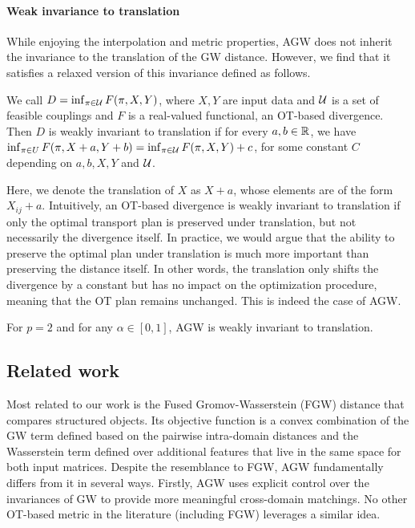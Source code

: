 \paragraph{Weak invariance to translation}
While enjoying the interpolation and metric properties, AGW does not inherit the invariance
to the translation of the GW distance. However, we find that it satisfies a relaxed version
of this invariance defined as follows.
\begin{definition}
    We call $D = \inf_{\pi \in \mathcal U} F(\pi, X, Y)$, where $X, Y$ are input data and $\mathcal U$
    is a set of feasible couplings and $F$ is a real-valued functional, an OT-based divergence.
    Then $D$ is weakly invariant to translation if for every $a, b \in \mathbb R$, we have
    $\inf_{\pi \in U} F(\pi, X + a, Y+b) = \inf_{\pi \in \mathcal U} F(\pi, X, Y) + c$,
    for some constant $C$ depending on $a, b, X, Y$ and $\mathcal U$.
\end{definition}
Here, we denote the translation of $X$ as $X + a$, whose elements are of the form $X_{ij} + a$.
Intuitively, an OT-based divergence is weakly invariant to translation if only
the optimal transport plan is preserved under translation, but not necessarily the divergence itself.
In practice, we would argue that the ability to preserve the optimal plan under translation
is much more important than preserving the distance itself. In other words,
the translation only shifts the divergence by a constant but has no impact on the optimization procedure,
meaning that the OT plan remains unchanged. This is indeed the case of AGW.
\begin{proposition}
    \label{prop:invariant} For $p=2$ and for any $\alpha \in [0,1]$,
    AGW is weakly invariant to translation.
\end{proposition}

\subsection{Related work}

Most related to our work is the Fused Gromov-Wasserstein (FGW) distance \citep{Vayer19b}
that compares structured objects. Its objective function is a convex combination of
the GW term defined based on the pairwise intra-domain distances and the Wasserstein term
defined over additional features that live in the same space for both input matrices.
Despite the resemblance to FGW, AGW fundamentally differs from it in several ways.
Firstly, AGW uses explicit control over the invariances of GW to provide more meaningful
cross-domain matchings. No other OT-based metric in the literature (including FGW)
leverages a similar idea.

